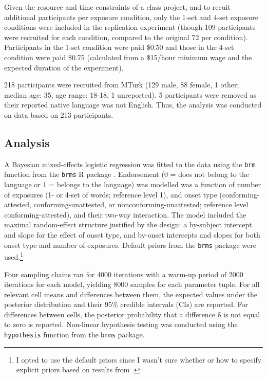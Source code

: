 \documentclass[letterpaper,11pt]{article}
\begin{document}
Given the resource and time constraints of a class project, and to recuit additional participants per exposure condition, only the 1-set and 4-set exposure conditions were included in the replication experiment (though 109 participants were recruited for each condition, compared to the original 72 per condition).
Participants in the 1-set condition were paid \$0.50 and those in the 4-set condition were paid \$0.75 (calculated from a \$15/hour minimum wage and the expected duration of the experiment).

218 participants were recruited from MTurk (129 male, 88 female, 1 other; median age: 35, age range: 18-18, 1 unreported).
5 participants were removed as their reported native language was not English.
Thus, the analysis was conducted on data based on 213 participants.

\subsection{Analysis}

A Bayesian mixed-effects logistic regression was fitted to the data using the \texttt{brm} function from the \texttt{brms} R package \parencite{burkner2017brms}.
Endorsement (0 = does not belong to the language or 1 = belongs to the language) was modelled was a function of number of exposures (1- or 4-set of words; reference level 1), and onset type (conforming-attested, conforming-unattested, or nonconforming-unattested; reference level conforming-attested), and their two-way interaction.
The model included the maximal random-effect structure justified by the design: a by-subject intercept and slope for the effect of onset type, and by-onset intercepts and slopes for both onset type and number of exposures.
Default priors from the \texttt{brms} package were used.\footnote{I opted to use the default priors since I wasn't sure whether or how to specify explicit priors based on results from \textcite{linzen2017rapid}.}

Four sampling chains ran for 4000 iterations with a warm-up period of 2000 iterations for each model, yielding 8000 samples for each parameter tuple. 
For all relevant cell means and differences between them, the expected values under the posterior distribution and their 95\% credible intervals (CIs) are reported.
For differences between cells, the posterior probability that a difference δ is not equal to zero is reported.
Non-linear hypothesis testing was conducted using the \texttt{hypothesis} function from the \texttt{brms} package.
\end{document}
